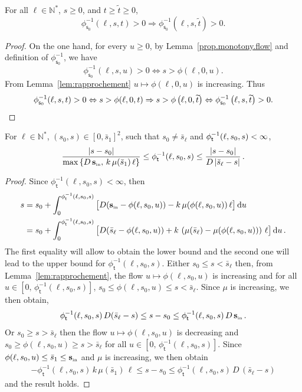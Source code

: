 \documentclass[AHL,Unicode,longabstracts,published]{cedram}
\newcommand{\NN}{\mathbb{N}}
\newcommand{\Sin}{{\mathbf s}_{\textrm{\tiny\rm in}}}
\newcommand{\dif}{\mathrm{d}}
\newcommand{\barmu}{\mu(\bar s_1)}
\newcommand{\phit}{\phi_\textsf{t}^{-1}}
\newcommand{\phis}{\phi_{\textsf{s}_0}^{-1}}
\newcommand{\1}{\mathbf{1}}
\begin{document}
\begin{lemm}\label{lem:phispos}
For all $\ell \in \NN^*$, $s\geq 0$, and $t\geq \widetilde{t}\geq 0$,
\[
\phis(\ell,s,t)>0 \Rightarrow \phis\left(\ell,s,\widetilde{t}\right)>0.
\]
\end{lemm}
\begin{proof}
On the one hand, for every $u\geq 0$, by Lemma~\ref{prop.monotony.flow} and definition of $\phis$, we have
\[
\phis(\ell,s,u)>0 \Leftrightarrow s> \phi(\ell,0,u).
\]
From Lemma~\ref{lem:rapprochement} $u \mapsto \phi(\ell,0,u)$ is increasing. Thus
\[
\phis(\ell,s,t)>0 \Leftrightarrow s> \phi(\ell,0,t) \Rightarrow s> \phi\left(\ell,0,\widetilde{t}\right) \Leftrightarrow \phis\left(\ell,s,\widetilde{t}\right)>0. \qedhere
\]
\end{proof}
\begin{lemm}\label{lemme.control.phi_moins_1}
For $\ell \in \NN^*$, $(s_0,s)\in [0,\bar s_1]^2$, such that $s_0\neq \bar s_\ell$ and $\phit(\ell,s_0,s)\linebreak<\infty$,
\[
\frac{|s-s_0|}{\max\left\{D\,\Sin,\,k\,\barmu\,\ell\right\}} \leq \phit(\ell,s_0,s) \leq \frac{|s-s_0|}{D\,|\bar s_\ell-s|}\,.
\]
\end{lemm}
\begin{proof}
Since $\phit(\ell,s_0,s)<\infty$, then
\begin{align*}
s &= s_0 + \int_0^{\phit(\ell,s_0,s)}\big[D(\Sin-\phi(\ell,s_0,u))-k\,\mu(\phi(\ell,s_0,u))\,\ell\big]\,\dif u
\\
&= s_0 + \int_0^{\phit(\ell,s_0,s)}\big[D(\bar s_\ell-\phi(\ell,s_0,u))+k\,\left(\mu(\bar s_\ell)-\mu(\phi(\ell,s_0,u))\right)\,\ell\big]\,\dif u\,.
\end{align*}
The first equality will allow to obtain the lower bound and the second one will lead to the upper bound for $\phit(\ell,s_0,s)$. Either $s_0\leq s < \bar s_\ell$ then, from Lemma~\ref{lem:rapprochement}, the flow $u \mapsto \phi(\ell,s_0,u)$ is increasing and for all $u\in[0,\,\phit(\ell,s_0,s)]$, $s_0\leq \phi(\ell,s_0,u) \leq s < \bar s_\ell$. Since $\mu$ is increasing, we then obtain,
\begin{align*}
\phit(\ell,s_0,s)\,D(\bar s_\ell-s)
\leq s-s_0 \leq \phit(\ell,s_0,s)\,D\,\Sin\,.
\end{align*}
Or $s_0 \geq s> \bar s_\ell$ then the flow $u \mapsto \phi(\ell,s_0,u)$ is decreasing and $s_0\geq \phi(\ell,s_0,u) \geq s > \bar s_\ell$ for all $u\in[0,\,\phit(\ell,s_0,s)]$. Since $\phi(\ell,s_0,u)\leq \bar s_1\leq \Sin$ and $\mu$ is increasing, we then obtain
\begin{align*}
- \phit(\ell,s_0,s)\,k\,\barmu\,\ell
\leq s-s_0 \leq \phit(\ell,s_0,s)\,D\,(\bar s_\ell-s)
\end{align*}
and the result holds.
\end{proof}
\end{document}
